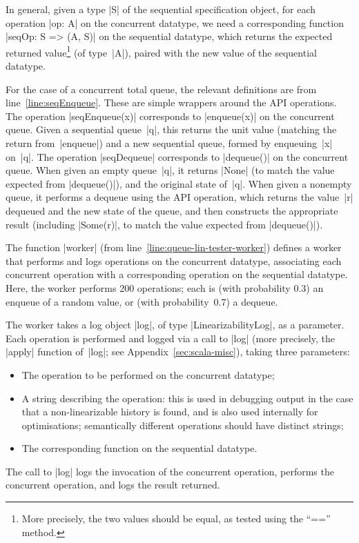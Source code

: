 In general, given a type |S| of the sequential specification object, for each
operation |op: A| on the concurrent datatype, we need a corresponding function
|seqOp: S => (A, S)| on the sequential datatype, which returns the expected
returned value\footnote{More precisely, the two values should be equal, as
  tested using the ``{\scalashape ==}'' method.} (of type~|A|), paired with
the new value of the sequential datatype.

For the case of a concurrent total queue, the relevant definitions are from
line~\ref{line:seqEnqueue}.  These are simple wrappers around the API
operations.  The operation |seqEnqueue(x)| corresponds to |enqueue(x)| on the
concurrent queue.  Given a sequential queue~|q|, this returns the unit value
(matching the return from~|enqueue|) and a new sequential queue, formed by
enqueuing~|x| on~|q|.  The operation |seqDequeue| corresponds to |dequeue()|
on the concurrent queue.  When given an empty queue~|q|, it returns |None| (to
match the value expected from |dequeue()|), and the original state of~|q|.
When given a nonempty queue, it performs a dequeue using the API
operation, which returns the value~|r| dequeued and the new state of the
queue, and then constructs the appropriate result (including |Some(r)|, to
match the value expected from |dequeue()|).


The function |worker| (from line~\ref{line:queue-lin-tester-worker}) defines
a worker that performs and logs operations on the concurrent datatype,
associating each concurrent operation with a corresponding operation on the
sequential datatype.  Here, the worker performs 200 operations; each is (with
probability 0.3) an enqueue of a random value, or (with probability~0.7) a
dequeue.


The worker takes a log object |log|, of type
|LinearizabilityLog|, as a
parameter.  Each operation is performed and logged via a call to |log| (more
precisely, the |apply| function of~|log|; see Appendix~\ref{sec:scala-misc}),
taking three parameters:
%
\begin{itemize}
\item
The operation to be performed on the concurrent datatype;

\item A string describing the operation: this is used in debugging output in
  the case that a non-linearizable history is found, and is also used
  internally for optimisations; semantically different operations should have
  distinct strings;

\item
The corresponding function on the sequential datatype.
\end{itemize}
%
The call to |log| logs the invocation of the concurrent operation,
performs the concurrent operation, and logs the result returned.

